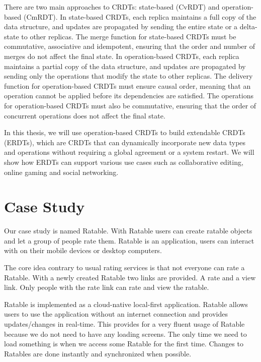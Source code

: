 \documentclass[
	ngerman,
	ruledheaders=section,   %
	class=report,		    %
	thesis={type=bachelor}, %
	accentcolor=9c,			%
	custommargins=true,    %
	marginpar=false,        %
	parskip=half-,          %
	fontsize=11pt,          %
]{tudapub}
\begin{document}
There are two main approaches to CRDTs: state-based (CvRDT) and operation-based (CmRDT). In state-based CRDTs, each replica maintains a full copy of the data structure, and updates are propagated by sending the entire state or a delta-state to other replicas. The merge function for state-based CRDTs must be commutative, associative and idempotent, ensuring that the order and number of merges do not affect the final state. In operation-based CRDTs, each replica maintains a partial copy of the data structure, and updates are propagated by sending only the operations that modify the state to other replicas. The delivery function for operation-based CRDTs must ensure causal order, meaning that an operation cannot be applied before its dependencies are satisfied. The operations for operation-based CRDTs must also be commutative, ensuring that the order of concurrent operations does not affect the final state.

In this thesis, we will use operation-based CRDTs to build extendable CRDTs (ERDTs), which are CRDTs that can dynamically incorporate new data types and operations without requiring a global agreement or a system restart. We will show how ERDTs can support various use cases such as collaborative editing, online gaming and social networking.

\section{Case Study}
Our case study is named Ratable. With Ratable users can create ratable objects and let a group of people rate them. Ratable is an application, users can interact with on their mobile devices or desktop computers. 

The core idea contrary to usual rating services is that not everyone can rate a Ratable. With a newly created Ratable two links are provided. A rate and a view link. Only people with the rate link can rate and view the ratable.

Ratable is implemented as a cloud-native local-first application. Ratable allows users to use the application without an internet connection and provides updates/changes in real-time. This provides for a very fluent usage of Ratable because we do not need to have any loading screens. The only time we need to load something is when we access some Ratable for the first time. Changes to Ratables are done instantly and synchronized when possible.
\end{document}
